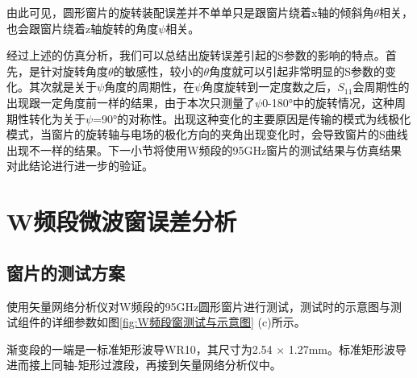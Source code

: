 \documentclass[master]{thesis-uestc}
\begin{document}
由此可见，圆形窗片的旋转装配误差并不单单只是跟窗片绕着x轴的倾斜角$\theta$相关，也会跟窗片绕着z轴旋转的角度$\psi$相关。

经过上述的仿真分析，我们可以总结出旋转误差引起的S参数的影响的特点。首先，是针对旋转角度\(\theta\)的敏感性，较小的\(\theta\)角度就可以引起非常明显的S参数的变化。其次就是关于\(\psi\)角度的周期性，在\(\psi\)角度旋转到一定度数之后，\(S_{11}\)会周期性的出现跟一定角度前一样的结果，由于本次只测量了\(\psi\)0-180°中的旋转情况，这种周期性转化为关于\(\psi\)=90°的对称性。出现这种变化的主要原因是传输的模式为线极化模式，当窗片的旋转轴与电场的极化方向的夹角出现变化时，会导致窗片的S曲线出现不一样的结果。下一小节将使用W频段的95GHz窗片的测试结果与仿真结果对此结论进行进一步的验证。

\section{W频段微波窗误差分析}
\subsection{窗片的测试方案}
使用矢量网络分析仪对W频段的95GHz圆形窗片进行测试，测试时的示意图与测试组件的详细参数如图\ref{fig:W频段窗测试与示意图} (c)所示。

渐变段的一端是一标准矩形波导WR10，其尺寸为2.54 \(\times\) 1.27mm。标准矩形波导进而接上同轴-矩形过渡段，再接到矢量网络分析仪中。
\end{document}
